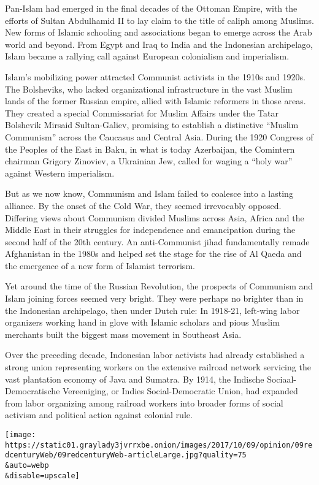 Pan-Islam had emerged in the final decades of the Ottoman Empire, with
the efforts of Sultan Abdulhamid II to lay claim to the title of caliph
among Muslims. New forms of Islamic schooling and associations began to
emerge across the Arab world and beyond. From Egypt and Iraq to India
and the Indonesian archipelago, Islam became a rallying call against
European colonialism and imperialism.

Islam's mobilizing power attracted Communist activists in the 1910s and
1920s. The Bolsheviks, who lacked organizational infrastructure in the
vast Muslim lands of the former Russian empire, allied with Islamic
reformers in those areas. They created a special Commissariat for Muslim
Affairs under the Tatar Bolshevik Mirsaid Sultan-Galiev, promising to
establish a distinctive ``Muslim Communism'' across the Caucasus and
Central Asia. During the 1920 Congress of the Peoples of the East in
Baku, in what is today Azerbaijan, the Comintern chairman Grigory
Zinoviev, a Ukrainian Jew, called for waging a ``holy war'' against
Western imperialism.

But as we now know, Communism and Islam failed to coalesce into a
lasting alliance. By the onset of the Cold War, they seemed irrevocably
opposed. Differing views about Communism divided Muslims across Asia,
Africa and the Middle East in their struggles for independence and
emancipation during the second half of the 20th century. An
anti-Communist jihad fundamentally remade Afghanistan in the 1980s and
helped set the stage for the rise of Al Qaeda and the emergence of a new
form of Islamist terrorism.

Yet around the time of the Russian Revolution, the prospects of
Communism and Islam joining forces seemed very bright. They were perhaps
no brighter than in the Indonesian archipelago, then under Dutch rule:
In 1918-21, left-wing labor organizers working hand in glove with
Islamic scholars and pious Muslim merchants built the biggest mass
movement in Southeast Asia.

Over the preceding decade, Indonesian labor activists had already
established a strong union representing workers on the extensive
railroad network servicing the vast plantation economy of Java and
Sumatra. By 1914, the Indische Sociaal-Democratische Vereeniging, or
Indies Social-Democratic Union, had expanded from labor organizing among
railroad workers into broader forms of social activism and political
action against colonial rule.

\texttt{[image: https://static01.graylady3jvrrxbe.onion/images/2017/10/09/opinion/09redcenturyWeb/09redcenturyWeb-articleLarge.jpg?quality=75\\\&auto=webp\\\&disable=upscale]}

